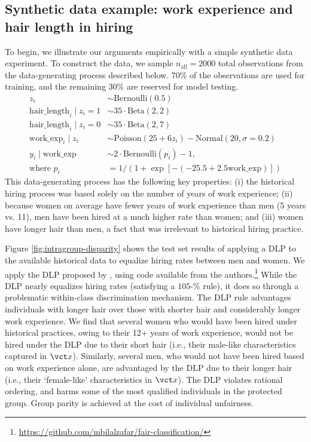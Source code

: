 %
% 
\subsection{Synthetic data example: work experience and hair length in hiring} \label{sec:synthetic}
To begin, we illustrate our arguments empirically 
with a simple synthetic data experiment.  
To construct the data, 
we sample $n_{\text{all}} = 2000$ total observations 
from the data-generating process described below.  
70\% of the observations are used for training, 
and the remaining 30\% are reserved for model testing.  
\begin{align*}
z_i &\sim \mathrm{Bernoulli}(0.5) \\
\mathrm{hair\_length}_i \mid z_i = 1 &\sim  35 \cdot \mathrm{Beta}(2,2) \\ 
\mathrm{hair\_length}_i \mid z_i = 0 &\sim  35 \cdot \mathrm{Beta}(2,7) \\ 
\mathrm{work\_exp}_i \mid z_i &\sim  \mathrm{Poisson}(25 + 6z_i) - \mathrm{Normal}(20, \sigma = 0.2) \\
y_i \mid \mathrm{work\_exp}  &\sim 2 \cdot \mathrm{Bernoulli}(p_i) - 1\text{,} \\ 
\text{where  } p_i &= 1 / \left(1 + \exp[-(-25.5 + 2.5\mathrm{work\_exp})]\right)
\end{align*}
This data-generating process 
has the following key properties: 
(i) the historical hiring process 
was based solely on the number of years of work experience; 
(ii) because women on average have fewer years of work experience than men (5 years vs. 11), 
men have been hired at a much higher rate than women; 
and (iii) women have longer hair than men, 
a fact that was irrelevant to historical hiring practice.

Figure \ref{fig:intragroup-disparity} 
shows the test set results of applying a DLP 
to the available historical data 
to equalize hiring rates between men and women.  
We apply the DLP proposed by \citet{zafar2017fairness}, 
using code available from the authors.\footnote{\url{https://github.com/mbilalzafar/fair-classification/}} 
While the DLP nearly equalizes hiring rates 
(satisfying a $105$-\% rule), 
it does so through a problematic 
within-class discrimination mechanism.  
The DLP rule advantages individuals 
with longer hair over those with shorter hair 
and considerably longer work experience.  
We find that several women 
who would have been hired under historical practices, 
owing to their 12+ years of work experience, 
would not be hired under the DLP 
due to their short hair 
(i.e., their male-like characteristics captured in $\vct x$). Similarly, several men,
who would not have been hired based on work experience alone, are advantaged by the DLP due to their longer hair  
(i.e., their `female-like' characteristics in $\vct x$).  
The DLP violates rational ordering, 
and harms some of the most qualified individuals 
in the protected group.  
Group parity is achieved at the cost of individual unfairness.  




